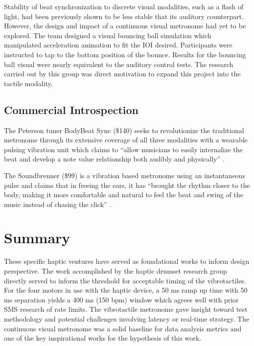 Stability of beat synchronization to discrete visual modalities, such as a flash of light, had been previously shown to be less stable that its auditory counterpart. However, the design and impact of a continuous visual metronome had yet to be explored. The team designed a visual bouncing ball simulation which manipulated acceleration animation to fit the IOI desired. Participants were instructed to tap to the bottom position of the bounce. Results for the bouncing ball visual were nearly equivalent to the auditory control tests. The research carried out by this group was direct motivation to expand this project into the tactile modality.

\subsection{Commercial Introspection} \label{commercial}
The Peterson tuner BodyBeat Sync (\$140) seeks to revolutionize the traditional metronome through its extensive coverage of all three modalities with a wearable pulsing vibration unit which claims to “allow musicians to easily internalize the beat and develop a note value relationship both audibly and physically” \cite{Peterson}.

The Soundbrenner (\$99) is a vibration based metronome using an instantaneous pulse and claims that in freeing the ears, it has “brought the rhythm closer to the body, making it more comfortable and natural to feel the beat and swing of the music instead of chasing the click” \cite{Soundbrenner}.

\section{Summary}
These specific haptic ventures have served as foundational works to inform design perspective. The work accomplished by the haptic drumset research group directly served to inform the threshold for acceptable timing of the vibrotactiles. For the four motors in use with the haptic device, a 50 ms ramp up time with 50 ms separation yields a 400 ms (150 bpm) window which agrees well with prior SMS research of rate limits. The vibrotactile metronome gave insight toward test methodology and potential challenges involving latency or real-time strategy. The continuous visual metronome was a solid baseline for data analysis metrics and one of the key inspirational works for the hypothesis of this work.